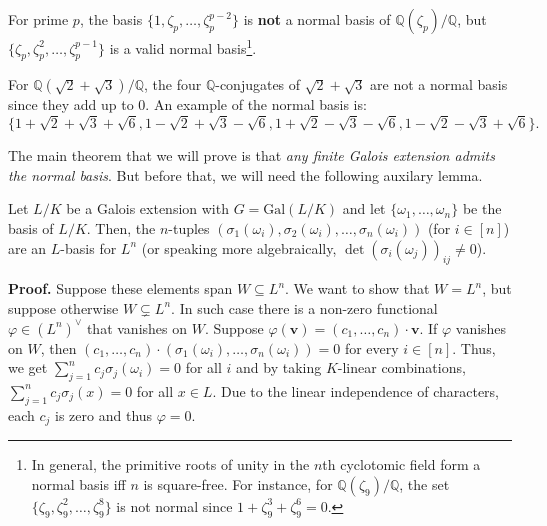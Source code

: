 \documentclass{template}
\begin{document}
\begin{example}
    For prime $p$, the basis $\{1,\zeta_p,\dots,\zeta_p^{p-2}\}$ is \textbf{not}
    a normal basis of $\mathbb{Q}(\zeta_p)/\mathbb{Q}$, but
    $\{\zeta_p,\zeta_p^2,\dots,\zeta_p^{p-1}\}$ is a valid normal
    basis\footnote{In general, the primitive roots of unity in the $n$th
    cyclotomic field form a normal basis iff $n$ is square-free. For instance,
    for $\mathbb{Q}(\zeta_9)/\mathbb{Q}$, the set
    $\{\zeta_9,\zeta_9^2,\dots,\zeta_9^8\}$ is not normal since
    $1+\zeta_9^3+\zeta_9^6=0$.}.
\end{example}

\begin{example}
    For $\mathbb{Q}(\sqrt{2}+\sqrt{3})/\mathbb{Q}$, the four $\mathbb{Q}$-conjugates 
    of $\sqrt{2}+\sqrt{3}$ are not a normal basis since they add up to $0$. An example 
    of the normal basis is:
    \begin{equation*}
        \{1+\sqrt{2}+\sqrt{3}+\sqrt{6}, 1-\sqrt{2}+\sqrt{3}-\sqrt{6}, 1+\sqrt{2}-\sqrt{3}-\sqrt{6}, 1-\sqrt{2}-\sqrt{3}+\sqrt{6}\}.
    \end{equation*}
\end{example}

The main theorem that we will prove is that \textit{any finite Galois extension
admits the normal basis}. But before that, we will need the following auxilary
lemma.

\begin{lemma}
    Let $L/K$ be a Galois extension with $G=\text{Gal}(L/K)$ and let
    $\{\omega_1,\dots,\omega_n\}$ be the basis of $L/K$. Then, the $n$-tuples
    $(\sigma_1(\omega_i), \sigma_2(\omega_i), \dots, \sigma_n(\omega_i))$ (for
    $i \in [n]$) are an $L$-basis for $L^n$ (or speaking more algebraically,
    $\det(\sigma_i(\omega_j))_{ij} \neq 0$).
\end{lemma}

\textbf{Proof.} Suppose these elements span $W \subseteq L^n$. We want to show
that $W=L^n$, but suppose otherwise $W \subsetneq L^n$. In such case there is a
non-zero functional $\varphi \in (L^n)^{\vee}$ that vanishes on $W$. Suppose
$\varphi(\mathbf{v}) = (c_1,\dots,c_n) \cdot \mathbf{v}$. If $\varphi$ vanishes
on $W$, then $(c_1,\dots,c_n) \cdot
(\sigma_1(\omega_i),\dots,\sigma_n(\omega_i))=0$ for every $i \in [n]$. Thus, we
get $\sum_{j=1}^nc_j\sigma_j(\omega_i)=0$ for all $i$ and by taking
$K$-linear combinations, $\sum_{j=1}^nc_j\sigma_j(x)=0$ for all $x \in L$.
Due to the linear independence of characters, each $c_j$ is zero and thus
$\varphi=0$.
\end{document}
